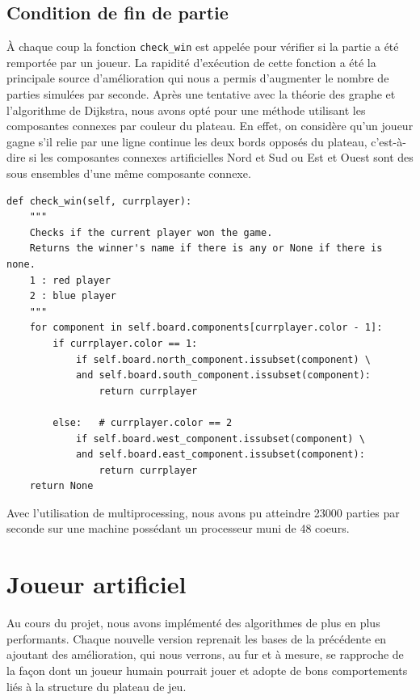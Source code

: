 \documentclass[a4paper]{article}
\theoremstyle{definition}
\begin{document}
\subsection{Condition de fin de partie}

À chaque coup la fonction \texttt{check\_win} est appelée pour vérifier si la partie a été remportée par un joueur. La rapidité d'exécution de cette fonction a été la principale source d'amélioration qui nous a permis d'augmenter le nombre de parties simulées par seconde. Après une tentative avec la théorie des graphe et l'algorithme de Dijkstra, nous avons opté pour une méthode utilisant les composantes connexes par couleur du plateau. En effet, on considère qu'un joueur gagne s'il relie par une ligne continue les deux bords opposés du plateau, c'est-à-dire si les composantes connexes artificielles Nord et Sud ou Est et Ouest sont des sous ensembles d'une même composante connexe.

\begin{lstlisting}
def check_win(self, currplayer):
	"""
	Checks if the current player won the game. 
	Returns the winner's name if there is any or None if there is none.
	1 : red player
	2 : blue player
	"""
	for component in self.board.components[currplayer.color - 1]:
		if currplayer.color == 1:
			if self.board.north_component.issubset(component) \
			and self.board.south_component.issubset(component):
				return currplayer
			
		else: 	# currplayer.color == 2
			if self.board.west_component.issubset(component) \
			and self.board.east_component.issubset(component):
				return currplayer
	return None
\end{lstlisting}

Avec l'utilisation de multiprocessing, nous avons pu atteindre 23000 parties par seconde sur une machine possédant un processeur muni de 48 coeurs.

\newpage


\section{Joueur artificiel}

Au cours du projet, nous avons implémenté des algorithmes de plus en plus performants. Chaque nouvelle version reprenait les bases de la précédente en ajoutant des amélioration, qui nous verrons, au fur et à mesure, se rapproche de la façon dont un joueur humain pourrait jouer et adopte de bons comportements liés à la structure du plateau de jeu.
\end{document}
